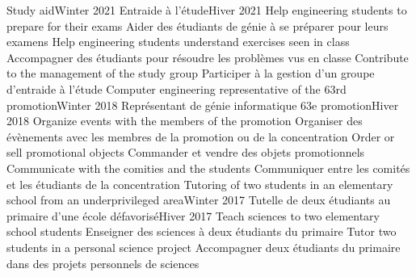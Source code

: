     \resumeSubHeadingListStart
      \resumeProjectHeadingEnFr
          {Study aid}{Winter 2021}
          {Entraide à l’étude}{Hiver 2021}
            \resumeItemListStart
                \resumeItemEnFr
                    {Help engineering students to prepare for their exams}
                    {Aider des étudiants de génie à se préparer pour leurs examens}
                \resumeItemEnFr
                    {Help engineering students understand exercises seen in class}
                    {Accompagner des étudiants pour résoudre les problèmes vus en classe}
                \resumeItemEnFr
                    {Contribute to the management of the study group}
                    {Participer à la gestion d’un groupe d’entraide à l’étude}
            \resumeItemListEnd
      \resumeProjectHeadingEnFr
          {Computer engineering representative of the 63rd promotion}{Winter 2018}
          {Représentant de génie informatique 63e promotion}{Hiver 2018}
            \resumeItemListStart
                \resumeItemEnFr
                    {Organize events with the members of the promotion}
                    {Organiser des évènements avec les membres de la promotion ou de la concentration}
                \resumeItemEnFr
                    {Order or sell promotional objects}
                    {Commander et vendre des objets promotionnels}
                \resumeItemEnFr
                    {Communicate with the comities and the students}
                    {Communiquer entre les comités et les étudiants de la concentration}
            \resumeItemListEnd
      \resumeProjectHeadingEnFr
          {Tutoring of two students in an elementary school from an underprivileged area}{Winter 2017}
          {Tutelle de deux étudiants au primaire d’une école défavorisé}{Hiver 2017}
            \resumeItemListStart
                \resumeItemEnFr
                    {Teach sciences to two elementary school students}
                    {Enseigner des sciences à deux étudiants du primaire}
                \resumeItemEnFr
                    {Tutor two students in a personal science project}
                    {Accompagner deux étudiants du primaire dans des projets personnels de sciences}
            \resumeItemListEnd
    \resumeSubHeadingListEnd
  
